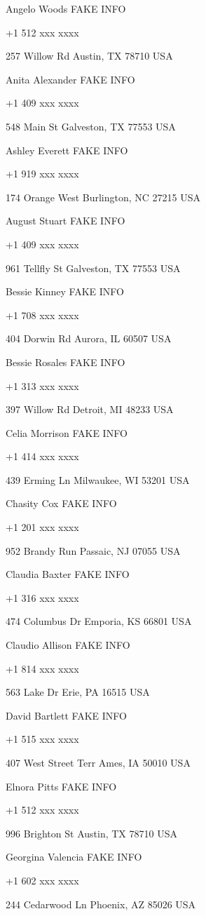 \documentclass[]{book}
\theoremstyle{definition}
\theoremstyle{definition}
\theoremstyle{definition}
\theoremstyle{remark}
\begin{document}
Angelo Woods FAKE INFO

+1 512 xxx xxxx

257 Willow Rd Austin, TX 78710 USA

Anita Alexander FAKE INFO

+1 409 xxx xxxx

548 Main St Galveston, TX 77553 USA

Ashley Everett FAKE INFO

+1 919 xxx xxxx

174 Orange West Burlington, NC 27215 USA

August Stuart FAKE INFO

+1 409 xxx xxxx

961 Tellfly St Galveston, TX 77553 USA

Bessie Kinney FAKE INFO

+1 708 xxx xxxx

404 Dorwin Rd Aurora, IL 60507 USA

Bessie Rosales FAKE INFO

+1 313 xxx xxxx

397 Willow Rd Detroit, MI 48233 USA

Celia Morrison FAKE INFO

+1 414 xxx xxxx

439 Erming Ln Milwaukee, WI 53201 USA

Chasity Cox FAKE INFO

+1 201 xxx xxxx

952 Brandy Run Passaic, NJ 07055 USA

Claudia Baxter FAKE INFO

+1 316 xxx xxxx

474 Columbus Dr Emporia, KS 66801 USA

Claudio Allison FAKE INFO

+1 814 xxx xxxx

563 Lake Dr Erie, PA 16515 USA

David Bartlett FAKE INFO

+1 515 xxx xxxx

407 West Street Terr Ames, IA 50010 USA

Elnora Pitts FAKE INFO

+1 512 xxx xxxx

996 Brighton St Austin, TX 78710 USA

Georgina Valencia FAKE INFO

+1 602 xxx xxxx

244 Cedarwood Ln Phoenix, AZ 85026 USA
\end{document}
